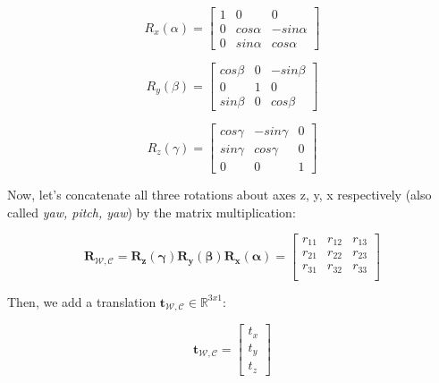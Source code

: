 \documentclass[12pt]{report}
\numberwithin{figure}{section}
\newcommand{\R}{\mathbb{R}}
\begin{document}
\begin{equation}
  R_x(\alpha) = 
  \begin{bmatrix}
    1 & 0 & 0\\
    0 & cos\alpha & -sin\alpha\\
    0 & sin\alpha & cos\alpha
  \end{bmatrix}\label{eq:rot_matrx_x}
\end{equation} 

\begin{equation}
  R_y(\beta) = 
  \begin{bmatrix}
    cos\beta & 0 & -sin\beta\\
    0 & 1 & 0\\
    sin\beta & 0 & cos\beta
  \end{bmatrix}\label{eq:rot_matrx_y}
\end{equation} 

\begin{equation}
  R_z(\gamma) = 
  \begin{bmatrix}
    cos\gamma & -sin\gamma & 0\\
    sin\gamma & cos\gamma & 0\\
    0 & 0 & 1
  \end{bmatrix}\label{eq:rot_matrx_z}
\end{equation} 

Now, let's concatenate all three rotations about axes z, y, x respectively 
(also 
called \textit{yaw, pitch, yaw}) by the matrix multiplication:

\begin{equation}
  \mathbf{R}_{\mathcal{W}, \mathcal{C}} = 
  \mathbf{R_z(\gamma)}\mathbf{R_y(\beta)}\mathbf{R_x(\alpha)}
  =
  \begin{bmatrix}
    r_{11} & r_{12} & r_{13}\\
    r_{21} & r_{22} & r_{23}\\
    r_{31} & r_{32} & r_{33}\\
  \end{bmatrix}\label{eq:rot_matrix_derivation}
\end{equation} 

Then, we add a translation $\mathbf{t}_{\mathcal{W}, \mathcal{C}} \in 
\R^{3x1}$:

\begin{equation}
  \mathbf{t}_{\mathcal{W}, \mathcal{C}} = 
  \begin{bmatrix}
    t_x \\ t_y \\ t_z
  \end{bmatrix}\label{eq:translation}
\end{equation} 
\end{document}
